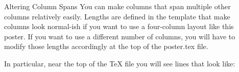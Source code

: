 \documentclass[final]{beamer}
\newlength{\sepwid}
\newlength{\onecolwid}
\newlength{\twocolwid}
\newlength{\threecolwid}
\begin{document}
\begin{frame}[t]
\begin{columns}[t]

    \begin{column}{\sepwid}\end{column}			%
    \begin{column}{\twocolwid}					  %
      \begin{block}{Altering Column Spans}
        You can make columns that span multiple other columns relatively easily. Lengths are defined in the template that make columns look normal-ish if you want to use a four-column layout like this poster. If you want to use a different number of columns, you will have to modify those lengths accordingly at the top of the poster.tex file.
        
        In particular, near the top of the TeX file you will see lines that look like:
        

\end{block}
\end{column}
\end{columns}
\end{frame}
\end{document}
